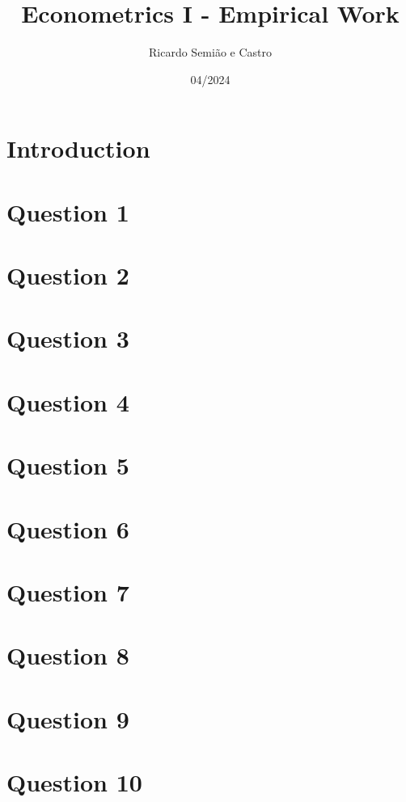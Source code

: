\documentclass{article}
\title{Econometrics I - Empirical Work}
\author{Ricardo Semião e Castro}
\date{04/2024}
\begin{document}
\maketitle

\section{Introduction}

\section*{Question 1}

\section*{Question 2}

\section*{Question 3}

\section*{Question 4}

\section*{Question 5}

\section*{Question 6}

\section*{Question 7}

\section*{Question 8}

\section*{Question 9}

\section*{Question 10}

%
%
\end{document}
